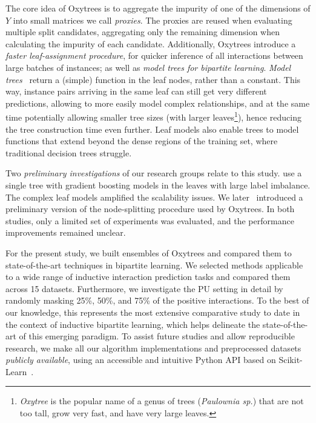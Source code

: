 \documentclass[letterpaper]{article}
\begin{document}
The core idea of Oxytrees is to aggregate the impurity of one of the dimensions of $Y$ into small matrices we call \textit{proxies}. The proxies are reused when evaluating multiple split candidates, aggregating only the remaining dimension when calculating the impurity of each candidate.
Additionally, Oxytrees introduce 
a \emph{faster leaf-assignment procedure}, for quicker inference of all interactions between large batches of instances; as well as
\emph{model trees for bipartite learning}.
\emph{Model trees}~\cite{quinlan1992learning,landwehr_logistic_2005,costa2023recent} return a (simple) function in the leaf nodes, rather than a constant.
This way, instance pairs arriving in the same leaf can still get very different predictions, allowing to more easily model complex relationships, and at the same time potentially allowing smaller tree sizes (with larger leaves\footnote{\textit{Oxytree} is the popular name of a genus of trees (\textit{Paulownia sp.}) that are not too tall, grow very fast, and have very large leaves.}), hence reducing the tree construction time even further.
Leaf models also enable trees to model functions that extend beyond the dense regions of the training set, where traditional decision trees struggle.

Two \emph{preliminary investigations} of our research groups relate to this study. \citet{alves2022twostep} use a single tree with gradient boosting models in the leaves with large label imbalance. The complex leaf models amplified the scalability issues.
We later~\cite{ilidio_fast_2024} introduced a preliminary version of the node-splitting procedure used by Oxytrees. In both studies, only a limited set of experiments was evaluated, and the performance improvements remained unclear.

For the present study, we built ensembles of Oxytrees and compared them to state-of-the-art techniques in bipartite learning. We selected methods applicable to a wide range of inductive interaction prediction tasks and compared them across 15 datasets.
Furthermore, we investigate the PU setting in detail by randomly masking 25\%, 50\%, and 75\% of the positive interactions.
To the best of our knowledge, this represents the most extensive comparative study to date in the context of inductive bipartite learning, which helps delineate the state-of-the-art of this emerging paradigm.
To assist future studies and allow reproducible research, we make all our algorithm implementations and preprocessed datasets \emph{publicly available},
using an accessible and intuitive Python API based on Scikit-Learn~\cite{pedregosa_scikit-learn_2011}.
\end{document}
